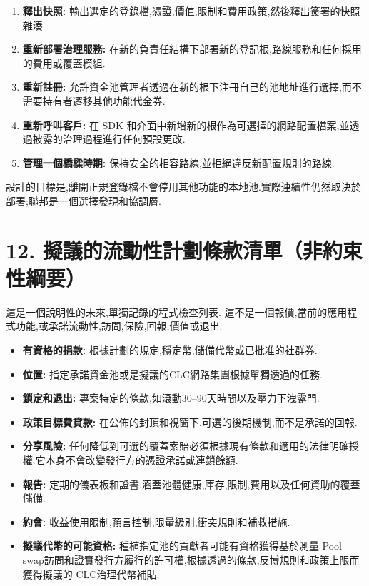 \documentclass[11pt]{article}
\begin{document}
\begin{enumerate}[leftmargin=*]
\item \textbf{釋出快照:} 輸出選定的登錄檔,憑證,價值,限制和費用政策,然後釋出簽署的快照雜湊.
\item \textbf{重新部署治理服務:} 在新的負責任結構下部署新的登記根,路線服務和任何採用的費用或覆蓋模組.
\item \textbf{重新註冊:} 允許資金池管理者透過在新的根下注冊自己的池地址進行選擇,而不需要持有者遷移其他功能代金券.
\item \textbf{重新呼叫客戶:} 在 SDK 和介面中新增新的根作為可選擇的網路配置檔案,並透過披露的治理過程進行任何預設更改.
\item \textbf{管理一個橋樑時期:} 保持安全的相容路線,並拒絕違反新配置規則的路線.
\end{enumerate}
設計的目標是,離開正規登錄檔不會停用其他功能的本地池.實際連續性仍然取決於部署;聯邦是一個選擇發現和協調層.


\section*{12. 擬議的流動性計劃條款清單（非約束性綱要）}

這是一個說明性的未來,單獨記錄的程式檢查列表. 這不是一個報價,當前的應用程式功能,或承諾流動性,訪問,保險,回報,價值或退出.

\begin{itemize}[leftmargin=*]
\item \textbf{有資格的捐款:} 根據計劃的規定,穩定幣,儲備代幣或已批准的社群券.
\item \textbf{位置:} 指定承諾資金池或是擬議的CLC網路集團根據單獨透過的任務.
\item \textbf{鎖定和退出:} 專案特定的條款,如滾動30--90天時間以及壓力下洩露門.
\item \textbf{政策目標費貸款:} 在公佈的封頂和視窗下,可選的後期機制,而不是承諾的回報.
\item \textbf{分享風險:} 任何降低到可選的覆蓋索賠必須根據現有條款和適用的法律明確授權.它本身不會改變發行方的憑證承諾或連鎖餘額.
\item \textbf{報告:} 定期的儀表板和證書,涵蓋池體健康,庫存,限制,費用以及任何資助的覆蓋儲備.
\item \textbf{約會:} 收益使用限制,預言控制,限量級別,衝突規則和補救措施.
\item \textbf{擬議代幣的可能資格:} 種植指定池的貢獻者可能有資格獲得基於測量 Pool-swap訪問和證實發行方履行的許可權,根據透過的條款,反博規則和政策上限而獲得擬議的 CLC治理代幣補貼.
\end{itemize}
\end{document}
